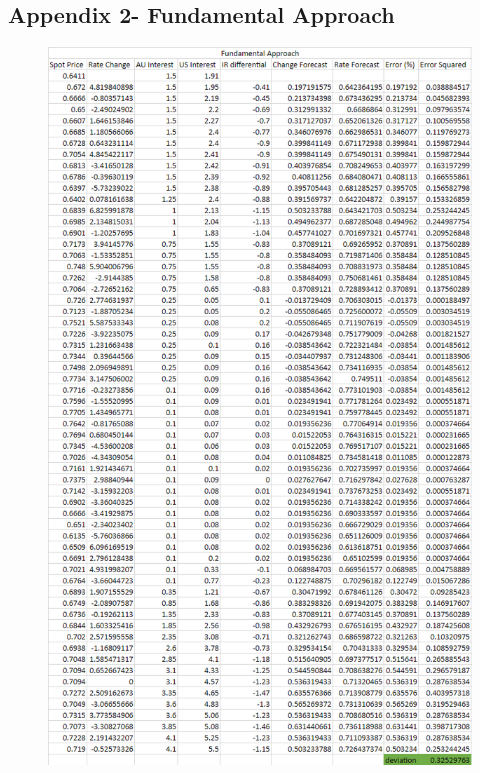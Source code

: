 \documentclass{article}
\let\Oldsubsection\subsection
\renewcommand{\subsection}{\FloatBarrier\Oldsubsection}
\begin{document}
\begin{figure}[h!]
\end{figure}

\break

\subsection*{Appendix 2- Fundamental Approach}


\begin{figure}[h!]
    \centering
    \includegraphics[scale=0.5]{graphs/appendix2-Fundamentals.png}
\end{figure}
\end{document}
